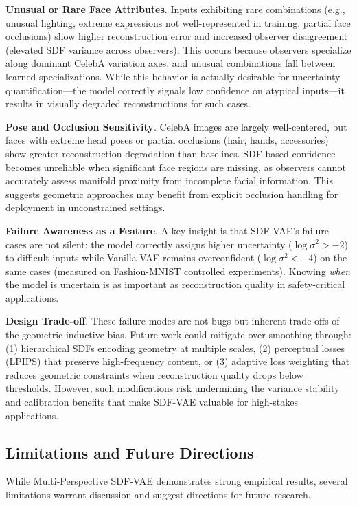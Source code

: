 \documentclass[10pt,twocolumn,letterpaper]{article}
\begin{document}
\textbf{Unusual or Rare Face Attributes}. Inputs exhibiting rare combinations (e.g., unusual lighting, extreme expressions not well-represented in training, partial face occlusions) show higher reconstruction error and increased observer disagreement (elevated SDF variance across observers). This occurs because observers specialize along dominant CelebA variation axes, and unusual combinations fall between learned specializations. While this behavior is actually desirable for uncertainty quantification---the model correctly signals low confidence on atypical inputs---it results in visually degraded reconstructions for such cases.

\textbf{Pose and Occlusion Sensitivity}. CelebA images are largely well-centered, but faces with extreme head poses or partial occlusions (hair, hands, accessories) show greater reconstruction degradation than baselines. SDF-based confidence becomes unreliable when significant face regions are missing, as observers cannot accurately assess manifold proximity from incomplete facial information. This suggests geometric approaches may benefit from explicit occlusion handling for deployment in unconstrained settings.

\textbf{Failure Awareness as a Feature}. A key insight is that SDF-VAE's failure cases are not silent: the model correctly assigns higher uncertainty ($\log \sigma^2 > -2$) to difficult inputs while Vanilla VAE remains overconfident ($\log \sigma^2 < -4$) on the same cases (measured on Fashion-MNIST controlled experiments). Knowing \textit{when} the model is uncertain is as important as reconstruction quality in safety-critical applications.

\textbf{Design Trade-off}. These failure modes are not bugs but inherent trade-offs of the geometric inductive bias. Future work could mitigate over-smoothing through: (1) hierarchical SDFs encoding geometry at multiple scales, (2) perceptual losses (LPIPS) that preserve high-frequency content, or (3) adaptive loss weighting that reduces geometric constraints when reconstruction quality drops below thresholds. However, such modifications risk undermining the variance stability and calibration benefits that make SDF-VAE valuable for high-stakes applications.

\subsection{Limitations and Future Directions}

While Multi-Perspective SDF-VAE demonstrates strong empirical results, several limitations warrant discussion and suggest directions for future research.
\end{document}

